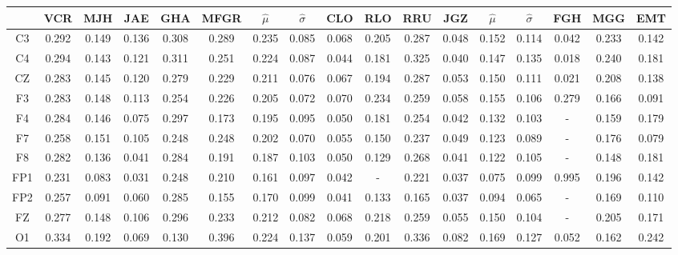 \begin{SidewaysFigure}
\centering
\begin{tabular}{c||ccccc|cc||cccc|cc||ccc}
& VCR & MJH & JAE & GHA & MFGR &$\widehat{\mu}$ & $\widehat{\sigma}$
& CLO & RLO & RRU & JGZ &$\widehat{\mu}$ & $\widehat{\sigma}$
& FGH & MGG & EMT \\
\hline
 C3 & 0.292    & 0.149    & 0.136    & 0.308    & 0.289    & 0.235    & 0.085    & 0.068    & 0.205    & 0.287    & 0.048    & 0.152    & 0.114    & 0.042    & 0.233    & 0.142     \\
 C4 & 0.294    & 0.143    & 0.121    & 0.311    & 0.251    & 0.224    & 0.087    & 0.044    & 0.181    & 0.325    & 0.040    & 0.147    & 0.135    & 0.018    & 0.240    & 0.181     \\
 CZ & 0.283    & 0.145    & 0.120    & 0.279    & 0.229    & 0.211    & 0.076    & 0.067    & 0.194    & 0.287    & 0.053    & 0.150    & 0.111    & 0.021    & 0.208    & 0.138     \\
 F3 & 0.283    & 0.148    & 0.113    & 0.254    & 0.226    & 0.205    & 0.072    & 0.070    & 0.234    & 0.259    & 0.058    & 0.155    & 0.106    & 0.279    & 0.166    & 0.091     \\
 F4 & 0.284    & 0.146    & 0.075    & 0.297    & 0.173    & 0.195    & 0.095    & 0.050    & 0.181    & 0.254    & 0.042    & 0.132    & 0.103    & -      & 0.159    & 0.179     \\
 F7 & 0.258    & 0.151    & 0.105    & 0.248    & 0.248    & 0.202    & 0.070    & 0.055    & 0.150    & 0.237    & 0.049    & 0.123    & 0.089    & -      & 0.176    & 0.079     \\
 F8 & 0.282    & 0.136    & 0.041    & 0.284    & 0.191    & 0.187    & 0.103    & 0.050    & 0.129    & 0.268    & 0.041    & 0.122    & 0.105    & -      & 0.148    & 0.181     \\
 FP1 & 0.231    & 0.083    & 0.031    & 0.248    & 0.210    & 0.161    & 0.097    & 0.042    & -      & 0.221    & 0.037    & 0.075    & 0.099    & 0.995    & 0.196    & 0.142     \\
 FP2 & 0.257    & 0.091    & 0.060    & 0.285    & 0.155    & 0.170    & 0.099    & 0.041    & 0.133    & 0.165    & 0.037    & 0.094    & 0.065    & -      & 0.169    & 0.110     \\
 FZ & 0.277    & 0.148    & 0.106    & 0.296    & 0.233    & 0.212    & 0.082    & 0.068    & 0.218    & 0.259    & 0.055    & 0.150    & 0.104    & -      & 0.205    & 0.171     \\
 O1 & 0.334    & 0.192    & 0.069    & 0.130    & 0.396    & 0.224    & 0.137    & 0.059    & 0.201    & 0.336    & 0.082    & 0.169    & 0.127    & 0.052    & 0.162    & 0.242     \\

\end{tabular}
\end{SidewaysFigure}
